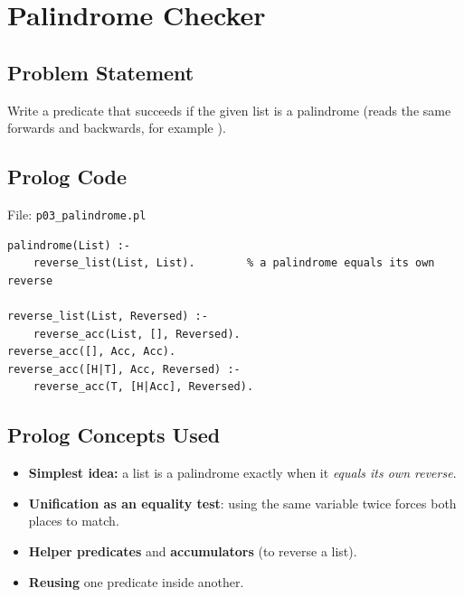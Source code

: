 \documentclass[11pt,a4paper]{article}
\newcommand{\pred}[1]{\texttt{\detokenize{#1}}}
\begin{document}
\newpage
\section{Palindrome Checker}
\setcounter{subsection}{0}
\subsection{Problem Statement}
Write a predicate \pred{palindrome(List)} that succeeds if the given list is a palindrome (reads the same forwards and backwards, for example \pred{[r,a,c,e,c,a,r]}).

\subsection{Prolog Code}
File: \texttt{p03\_palindrome.pl}
\begin{lstlisting}[style=pl]
palindrome(List) :-
    reverse_list(List, List).        % a palindrome equals its own reverse

reverse_list(List, Reversed) :-
    reverse_acc(List, [], Reversed).
reverse_acc([], Acc, Acc).
reverse_acc([H|T], Acc, Reversed) :-
    reverse_acc(T, [H|Acc], Reversed).
\end{lstlisting}

\subsection{Prolog Concepts Used}
\begin{itemize}[leftmargin=*]
  \item \textbf{Simplest idea:} a list is a palindrome exactly when it \emph{equals its own reverse}.
  \item \textbf{Unification as an equality test}: using the same variable twice forces both places to match.
  \item \textbf{Helper predicates} and \textbf{accumulators} (to reverse a list).
  \item \textbf{Reusing} one predicate inside another.
\end{itemize}
\end{document}
